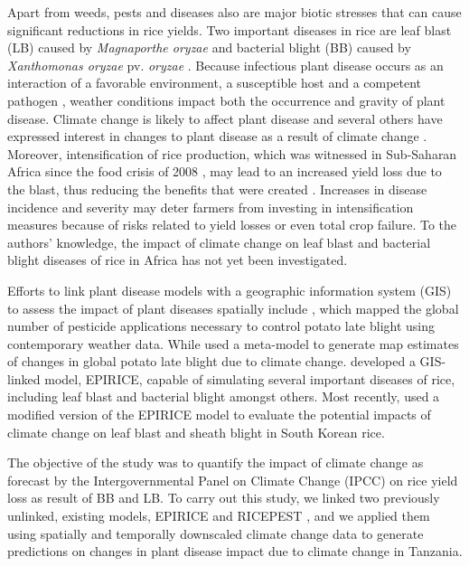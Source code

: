 \documentclass[preprint,review,12pt]{elsarticle}
\begin{document}
    Apart from weeds, pests and diseases also are major biotic stresses that can cause significant reductions in rice yields. Two important diseases in rice are leaf blast (LB) caused by \textit{Magnaporthe oryzae} and bacterial blight (BB) caused by \textit{Xanthomonas oryzae} pv. \textit{oryzae} \cite{Verdier2012}. Because infectious plant disease occurs as an interaction of a favorable environment, a susceptible host and a competent pathogen \cite{Madden2007}, weather conditions impact both the occurrence and gravity of plant disease. Climate change is likely to affect plant disease \cite{Anderson2004, Coakley1999, Garrett2006} and several others have expressed interest in changes to plant disease as a result of climate change \cite{Chakraborty2011, Juroszek2011, Luck2011, Pautasso2010, Savary2011, Sutherst2011}. Moreover, intensification of rice production, which was witnessed in Sub-Saharan Africa since the food crisis of 2008 \cite{Saito2013}, may lead to an increased yield loss due to the blast, thus reducing the benefits that were created \cite{Sere2013}. Increases in disease incidence and severity may deter farmers from investing in intensification measures because of risks related to yield losses or even total crop failure. To the authors' knowledge, the impact of climate change on leaf blast and bacterial blight diseases of rice in Africa has not yet been investigated.
    
    Efforts to link plant disease models with a geographic information system (GIS) to assess the impact of plant diseases spatially include  \citet{Hijmans2000}, which mapped the global number of pesticide applications necessary to control potato late blight using contemporary weather data. While \citet{Sparks2014} used a meta-model to generate map estimates of changes in global potato late blight due to climate change. \citet{Savary2012} developed a GIS-linked model, EPIRICE, capable of simulating several important diseases of rice, including leaf blast and bacterial blight amongst others. Most recently, \citet{Kim2015} used a modified version of the EPIRICE model to evaluate the potential impacts of climate change on leaf blast and sheath blight in South Korean rice.
    
    The objective of the study was to quantify the impact of climate change as forecast by the Intergovernmental Panel on Climate Change (IPCC) on rice yield loss as result of BB and LB. To carry out this study, we linked two previously unlinked, existing models, EPIRICE and RICEPEST \cite{Willocquet2000, Willocquet2002}, and we applied them using spatially and temporally downscaled climate change data to generate predictions on changes in plant disease impact due to climate change in Tanzania.
    
\end{document}

